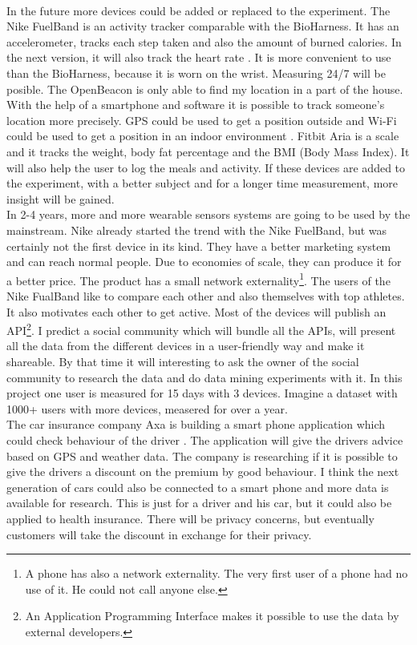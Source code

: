 	\\
	In the future more devices could be added or replaced to the experiment. The Nike FuelBand \cite{fuelband} is an activity tracker comparable with the BioHarness. It has an accelerometer, tracks each step taken and also the amount of burned calories. In the next version, it will also track the heart rate \cite{fuelband2}. It is more convenient to use than the BioHarness, because it is worn on the wrist. Measuring 24/7 will be posible. The OpenBeacon is only able to find my location in a part of the house. With the help of a smartphone and software it is possible to track someone's location more precisely. GPS could be used to get a position outside and Wi-Fi could be used to get a position in an indoor environment \cite{Howard-2003-283}. Fitbit Aria \cite{aria} is a scale and it tracks the weight, body fat percentage and the BMI (Body Mass Index). It will also help the user to log the meals and activity. If these devices are added to the experiment, with a better subject and for a longer time measurement, more insight will be gained.
	\\
	In 2-4 years, more and more wearable sensors systems are going to be used by the mainstream. Nike already started the trend with the Nike FuelBand, but was certainly not the first device in its kind. They have a better marketing system and can reach normal people. Due to economies of scale, they can produce it for a better price. The product has a small network externality\footnote{A phone has also a network externality. The very first user of a phone had no use of it. He could not call anyone else.}. The users of the Nike FualBand like to compare each other and also themselves with top athletes. It also motivates each other to get active. Most of the devices will publish an API\footnote{An Application Programming Interface makes it possible to use the data by external developers.}. I predict a social community which will bundle all the APIs, will present all the data from the different devices in a user-friendly way and make it shareable. By that time it will interesting to ask the owner of the social community to research the data and do data mining experiments with it. In this project one user is measured for 15 days with 3 devices. Imagine a dataset with 1000+ users with more devices, measered for over a year.
	\\	
	The car insurance company Axa is building a smart phone application which could check behaviour of the driver \cite{axa}. The application will give the drivers advice based on GPS and weather data. The company is researching if it is possible to give the drivers a discount on the premium by good behaviour. I think the next generation of cars could also be connected to a smart phone and more data is available for research. This is just for a driver and his car, but it could also be applied to health insurance. There will be privacy concerns, but eventually customers will take the discount in exchange for their privacy. 
